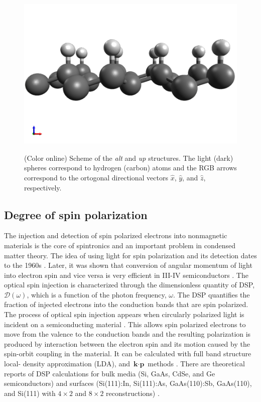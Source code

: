 \documentclass[pss]{wiley2sp} %
\begin{document}
\begin{figure}[t]
{ \includegraphics[width=0.49\linewidth]{strc/up2}\label{fig:upstrc}}
\caption{(Color online) Scheme of the \emph{alt} and \emph{up} structures. The light (dark) spheres correspond to hydrogen (carbon) atoms and the RGB arrows correspond to the ortogonal directional vectors $\hat{x}$, $\hat{y}$, and $\hat{z}$, respectively. \label{fig:structures}}
\end{figure}

\subsection{Degree of spin polarization}

The injection and detection of spin polarized electrons into nonmagnetic materials is the core of spintronics \cite{vzuticRMP04,fertRMP08} and an important  problem in condensed matter theory.
The idea of using light for spin polarization and its detection dates to the 1960s \cite{LampelPRL68}. Later, it was shown that conversion of angular momentum of light into electron spin and vice versa is very efficient in III-IV semiconductors \cite{dyakonovOO84}. The optical spin injection is characterized through the dimensionless quantity of DSP, $\mathcal{D}(\omega)$, which is a function of the photon frequency, $\omega$. The DSP quantifies the fraction of injected electrons into the conduction bands that are spin polarized.
The process of optical spin injection appears when circularly polarized light is incident on a semiconducting material \cite{dyakonovOO84}. This allows spin polarized electrons to move from the valence to the conduction bands and the resulting polarization is produced by interaction between the electron spin and its motion caused by the spin-orbit coupling in the material. It can be calculated with full band structure local- density approximation (LDA), and $\textbf{k}\cdot\textbf{p}$ methods \cite{nastosPRB07,cabellosPRB09}. There are theoretical reports of DSP calculations for bulk media (Si, GaAs, CdSe, and Ge semiconductors) \cite{nastosPRB07,cabellosPRB09} and surfaces (Si(111):In, Si(111):As, GaAs(110):Sb, GaAs(110), and Si(111) with $4\times2$ and $8\times2$ reconstructions) \cite{mendozaPRB12,arzatePRB14}. 
\end{document}
